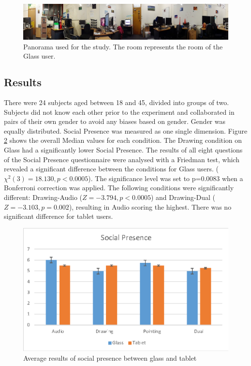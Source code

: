 \begin{figure}
    \centering
    \includegraphics[width=\linewidth]{images/63-pano-ismar14/envrionment-setup}
    \caption{Panorama used for the study. The room represents the room of the Glass user.}
    \label{fig:ismar14:envrionment-setup}
\end{figure}

\subsection{Results}

There were 24 subjects aged between 18 and 45, divided into groups of two. Subjects did not know each other prior to the experiment and collaborated in pairs of their own gender to avoid any biases based on gender. Gender was equally distributed. Social Presence was measured as one single dimension. Figure \ref{fig:ismar14:social-presence} shows the overall Median values for each condition. The Drawing condition on Glass had a significantly lower Social Presence. The results of all eight questions of the Social Presence questionnaire were analysed with a Friedman test, which revealed a significant difference between the conditions for Glass users. ($\chi^2(3)=18.130, p<0.0005$). The significance level was set to p=0.0083 when a Bonferroni correction was applied. The following conditions were significantly different: Drawing-Audio ($Z=-3.794, p<0.0005$) and Drawing-Dual ($Z=-3.103, p=0.002$), resulting in Audio scoring the highest. There was no significant difference for tablet users.

\begin{figure}
    \centering
    \includegraphics[width=.8\linewidth]{images/63-pano-ismar14/images-02.eps}
    \caption{Average results of social presence between glass and tablet}
    \label{fig:ismar14:social-presence}
\end{figure}

